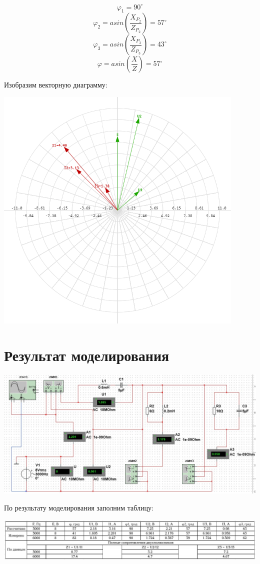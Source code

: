 \documentclass[14pt, a4paper]{article}
\begin{document}
    $$\varphi_1 = 90^\circ$$
    $$\varphi_2 = asin(\frac{X_{P_2}}{Z_{P_2}}) = 57^\circ$$
    $$\varphi_3 = asin(\frac{X_{P_3}}{Z_{P_3}}) = 43^\circ$$
    $$\varphi = asin(\frac{X}{Z}) = 57^\circ$$

    Изобразим векторную диаграмму:

    {\includegraphics[width=0.9\textwidth]{diag1.png}}


    \section*{Результат моделирования}

    {\includegraphics[width=1\textwidth]{design1.jpg}}

    По результату моделирования заполним таблицу:

    {\includegraphics[width=1\textwidth]{table.jpg}}
\end{document}
